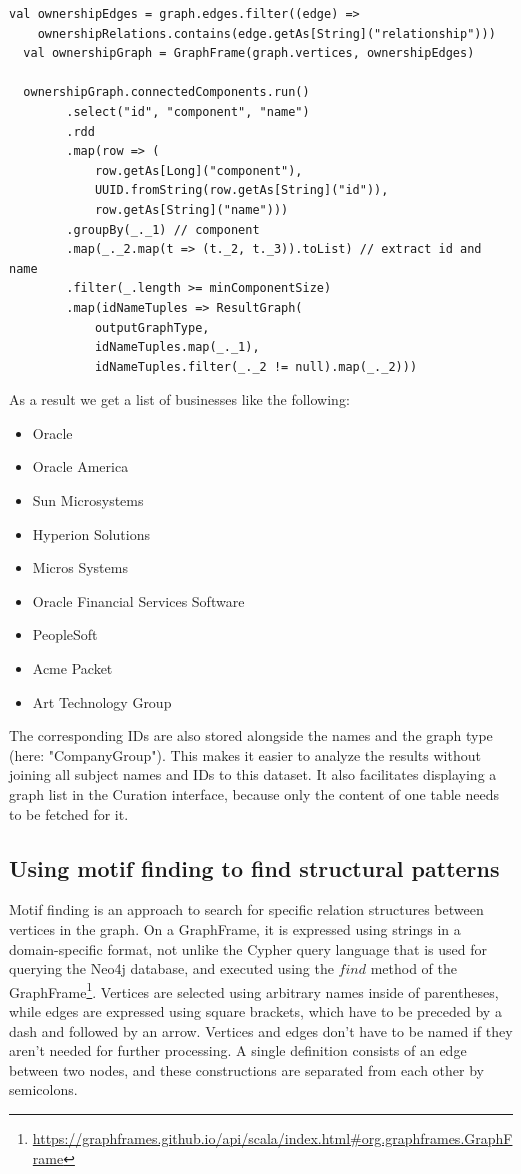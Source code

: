 \documentclass[
        a4paper,     %
        titlepage,   %
        oneside,     %
        parskip      %
]{scrartcl}          %
\begin{document}
  \begin{lstlisting}[style=scalaStyle,caption=Company Group Extraction]
  val ownershipEdges = graph.edges.filter((edge) =>
    ownershipRelations.contains(edge.getAs[String]("relationship")))
  val ownershipGraph = GraphFrame(graph.vertices, ownershipEdges)

  ownershipGraph.connectedComponents.run()
		.select("id", "component", "name")
		.rdd
		.map(row => (
			row.getAs[Long]("component"),
			UUID.fromString(row.getAs[String]("id")),
			row.getAs[String]("name")))
		.groupBy(_._1) // component
		.map(_._2.map(t => (t._2, t._3)).toList) // extract id and name
		.filter(_.length >= minComponentSize)
		.map(idNameTuples => ResultGraph(
			outputGraphType,
			idNameTuples.map(_._1),
			idNameTuples.filter(_._2 != null).map(_._2)))
  \end{lstlisting}

  As a result we get a list of businesses like the following:
  \begin{itemize}[noitemsep]
  \item Oracle
  \item Oracle America
  \item Sun Microsystems
  \item Hyperion Solutions
  \item Micros Systems
  \item Oracle Financial Services Software
  \item PeopleSoft
  \item Acme Packet
  \item Art Technology Group
  \end{itemize}

  The corresponding IDs are also stored alongside the names and the graph type (here: "CompanyGroup"). This makes it easier to analyze
  the results without joining all subject names and IDs to this dataset. It also facilitates displaying
  a graph list in the Curation interface, because only the content of one table needs to be fetched for it.

  \subsection{Using motif finding to find structural patterns}
  \label{sec:motif_finding}
  Motif finding is an approach to search for specific relation structures between
  vertices in the graph. On a GraphFrame, it is expressed using strings in a
  domain-specific format, not unlike the Cypher query language that is used for
  querying the Neo4j database, and executed using the $find$ method of the
  GraphFrame\footnote{\url{https://graphframes.github.io/api/scala/index.html\#org.graphframes.GraphFrame}}.
  Vertices are selected using arbitrary names inside of parentheses, while edges are
  expressed using square brackets, which have to be preceded by a dash and followed by
  an arrow. Vertices and edges don't have to be named if they aren't needed for further processing.
  A single definition consists of an edge between two nodes, and these constructions are
  separated from each other by semicolons.
\end{document}
